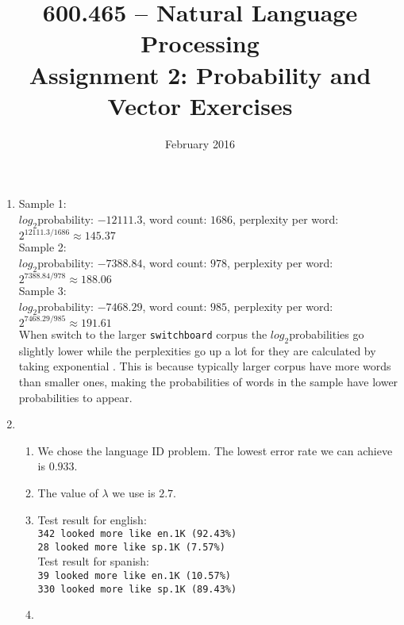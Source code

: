 \documentclass[10pt]{article}
\title{600.465 -- Natural Language Processing\\
Assignment 2: Probability and Vector Exercises}
\author{}
\date{February 2016}
\begin{document}
\maketitle
\begin{enumerate}
    \item  %
    Sample 1:\\ $log_2$probability: $-12111.3$, word count: $1686$, perplexity per word: $2^{12111.3/1686} \approx 145.37$\\
    Sample 2:\\ $log_2$probability: $-7388.84$, word count: $978$, perplexity per word: $2^{7388.84/978} \approx 188.06$\\
    Sample 3:\\ $log_2$probability: $-7468.29$, word count: $985$, perplexity per word: $2^{7468.29/985} \approx 191.61$\\
    
    When switch to the larger {\tt switchboard} corpus the $log_2$probabilities go slightly lower while the perplexities go up a lot for they are calculated by taking exponential . This is because typically larger corpus have more words than smaller ones, making the probabilities of words in the sample have lower probabilities to appear. 
    
    
     \item %
     	\begin{enumerate}
     		\item
     		We chose the language ID problem. The lowest error rate we can achieve is $0.933$.
     		\item
     		The value of $\lambda$ we use is $2.7$.
     		\item
     		Test result for english:\\
     		\texttt{342 looked more like en.1K (92.43\%)\\
     		28 looked more like sp.1K (7.57\%)  }\\
     		Test result for spanish:\\
     		\texttt{39 looked more like en.1K (10.57\%)\\
     		330 looked more like sp.1K (89.43\%) }
     		
     		\item
     	\end{enumerate}
    
    
\end{enumerate}
\end{document}
